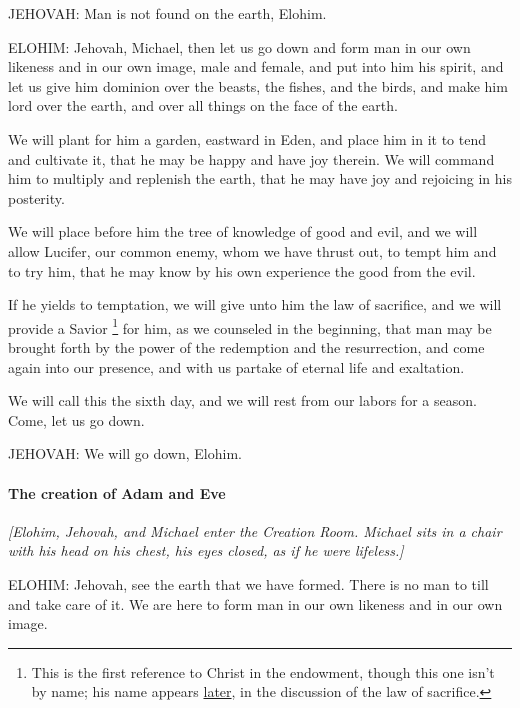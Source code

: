 				JEHOVAH: Man is not found on the earth, Elohim.

				ELOHIM: Jehovah, Michael, then let us go down and form man in our own likeness and in our own image, male and female, and put into him his spirit, and let us give him dominion over the beasts, the fishes, and the birds, and make him lord over the earth, and over all things on the face of the earth.

				We will plant for him a garden, eastward in Eden, and place him in it to tend and cultivate it, that he may be happy and have joy therein. We will command him to multiply and replenish the earth, that he may have joy and rejoicing in his posterity.

				We will place before him the tree of knowledge of good and evil, and we will allow Lucifer, our common enemy, whom we have thrust out, to tempt him and to try him, that he may know by his own experience the good from the evil.

				If he yields to temptation, we will give unto him the law of sacrifice, and we will provide a Savior%
					\footnote{%
						\label{ENDOWMENT-savior-first}%
						This is the first reference to Christ in the endowment, though this one isn't by name; his name appears \hyperref[TEMPLE-ENDOWMENT-ENDOW-PRE-1990-SACRIFICE]{later}, in the discussion of the law of sacrifice.
						}
				for him, as we counseled in the beginning, that man may be brought forth by the power of the redemption and the resurrection, and come again into our presence, and with us partake of eternal life and exaltation.

				We will call this the sixth day, and we will rest from our labors for a season. Come, let us go down.

				JEHOVAH: We will go down, Elohim.
				
			\paragraph{The creation of Adam and Eve}
				\label{TEMPLE-ENDOWMENT-ENDOW-PRE-1990-ADAM-EVE}
			
				\textit{[Elohim, Jehovah, and Michael enter the Creation Room. Michael sits in a chair with his head on his chest, his eyes closed, as if he were lifeless.]}

				ELOHIM: Jehovah, see the earth that we have formed. There is no man to till and take care of it. We are here to form man in our own likeness and in our own image.

